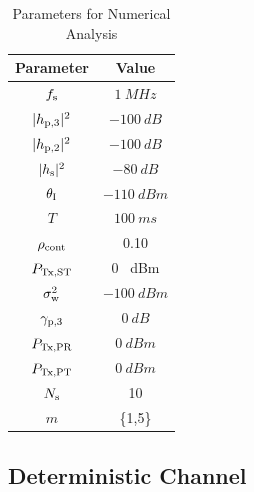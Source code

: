 
\begin{table}
\renewcommand{\arraystretch}{1.4}
\caption{Parameters for Numerical Analysis}
\label{tb_US:tb2}
\centering
\begin{tabular}{c||c}
\hline
\bfseries Parameter & \bfseries Value \\
\hline\hline
$f_{\text{s}}$  & $\SI{1}{MHz}$ \\ 
$|h_{\text{p,3}}|^2$ & $\SI{-100}{dB}$ \\ 
$|h_{\text{p,2}}|^2$ & $\SI{-100}{dB}$ \\ 
$|h_{\text{s}}|^2$ & $\SI{-80}{dB}$ \\ 
$\theta_{\text{I}}$ & $\SI{-110}{dBm}$ \\ 
$T$ & $\SI{100}{ms}$ \\ 
$\rho_{\text{cont}}$ & 0.10 \\ 
$P_{\text{Tx,ST}}$ & 0 \SI{}{dBm} \\ 
$\sigma^2_{\text{w}}$ & $\SI{-100}{dBm}$ \\ 
${\gamma}_{\text{p,3}}$ & $\SI{0}{dB}$ \\ 
$P_{\text{Tx,PR}}$ & $\SI{0}{dBm}$ \\ 
$P_{\text{Tx,PT}}$ & $\SI{0}{dBm}$ \\ 
$N_{\text{s}}$ & 10 \\ 
$m$ & \{1,5\} \\ \hline
\end{tabular}%
\end{table}

\subsection{Deterministic Channel} 

